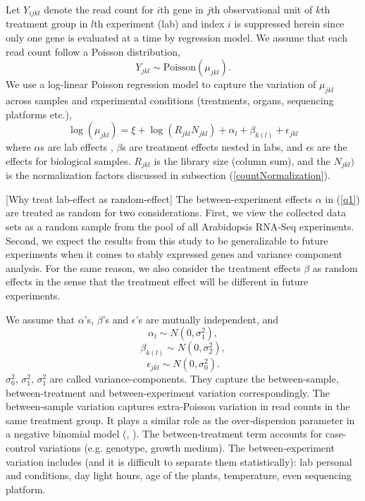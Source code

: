 \documentclass[11pt, a4paper]{article}
\begin{document}
Let $Y_{ijkl}$ denote the read count for $i$th gene
in $j$th observational unit of $k$th treatment group in $l$th experiment (lab)
and index $i$ is suppressed herein since only one gene is evaluated at a time
by regression model. We assume that each read count follow a Poisson
distribution,  
\[Y_{jkl}\sim \text{Poisson}(\mu_{jkl}).\] 
We use a log-linear Poisson regression model to capture 
the variation of $\mu_{jkl}$ across samples and experimental conditions (treatments,
organs, sequencing platforms etc.),
\begin{equation}\label{q1}
    \log( \mu_{jkl}) = \xi + \log(R_{jkl}N_{jkl})+ \alpha_l + \beta_{k(l)} + \epsilon_{jkl} 
\end{equation}
where $\alpha$s are lab effects ,  $\beta$s are treatment effects
nested in labs, and $\epsilon$s are the effects for biological samples. 
$R_{jkl}$ is the library size (column sum), and the $N_{jkl})$ is the normalization factors discussed in
subsection (\ref{countNormalization}).

[Why treat lab-effect as random-effect] The between-experiment effects $\alpha$ in (\ref{q1}) are treated as random for two considerations. First, we view the collected data sets as a random sample from the pool of all Arabidopsis RNA-Seq experiments. Second, we expect the results from this study to be generalizable to future experiments when it comes to stably expressed genes and variance component analysis.
For the same reason, we also consider the treatment effects $\beta$ as random effects
in the sense that the treatment effect will be different in future experiments.

We assume that $\alpha$'s, $\beta$'s and $\epsilon$'s are mutually independent, and  
  \[\alpha_l\sim N(0, \sigma^2_1),\] 
  \[\beta_{k(l)}\sim N(0, \sigma^2_2),\]
   \[\epsilon_{jkl}\sim N(0, \sigma_0^2).\]
$\sigma_0^2$, $\sigma_1^2$, $\sigma_1^2$ are called variance-components. They capture the
between-sample, between-treatment and between-experiment variation
correspondingly. The between-sample variation captures extra-Poisson variation in read counts
in the same treatment group. It plays a similar role as the over-dispersion parameter
in a negative binomial model (\cite{anders2010differential}, \cite{di2011nbp}).
The between-treatment term accounts for case-control variations (e.g. genotype, growth medium). 
The between-experiment variation includes (and it is difficult to separate them statistically): lab personal and conditions, day light hours, age of the plants, temperature, even sequencing platform.
\end{document}
